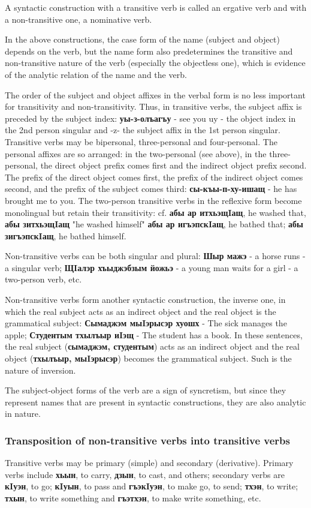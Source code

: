 \documentclass[a4paper,12pt]{book}
\newcommand{\1}[1]{\textbf{\emph{#1}}} %
\newcommand{\2}[1]{\textbf{[#1]}} %
\newcommand{\3}[1]{\fontsize{11pt}{0cm}\textbf{\emph{#1}}} %
\newcommand{\4}[1]{\fontsize{10pt}{0cm}\emph{#1}}	%
\newcommand{\5}[1]{\textbf{/#1/}} %
\newcommand{\6}[1]{\textbf{[#1]}} %
\newcommand{\7}[1]{\fontsize{12pt}{0cm}\emph{#1}} %
\newcommand{\8}[1]{\fontsize{12pt}{0cm}`#1'} %
\newcommand{\9}[1]{\fontsize{12pt}{0cm}(lit. `#1')} %
\begin{document}
A syntactic construction with a transitive verb is called an ergative verb and with a non-transitive one, a nominative verb.

In the above constructions, the case form of the name (subject and object) depends on the verb, but the name form also predetermines the transitive and non-transitive nature of the verb (especially the objectless one), which is evidence of the analytic relation of the name and the verb.

The order of the subject and object affixes in the verbal form is no less important for transitivity and non-transitivity. Thus, in transitive verbs, the subject affix is preceded by the subject index: \textbf{уы-з-олъагъу} - see you uy - the object index in the 2nd person singular and -z- the subject affix in the 1st person singular. Transitive verbs may be bipersonal, three-personal and four-personal. The personal affixes are so arranged: in the two-personal (see above), in the three-personal, the direct object prefix comes first and the indirect object prefix second. The prefix of the direct object comes first, the prefix of the indirect object comes second, and the prefix of the subject comes third: \textbf{сы-къы-п-ху-ишащ} - he has brought me to you. The two-person transitive verbs in the reflexive form become monolingual but retain their transitivity: cf. \textbf{абы ар итхьэщIащ}, he washed that, \textbf{абы зитхьэщIащ} "he washed himself" \textbf{абы ар игъэпскIащ}, he bathed that; \textbf{абы зигъэпскIащ}, he bathed himself.

Non-transitive verbs can be both singular and plural: \textbf{Шыр мажэ} - a horse runs - a singular verb; \textbf{ЩIалэр хъыджэбзым йожьэ} - a young man waits for a girl - a two-person verb, etc.

Non-transitive verbs form another syntactic construction, the inverse one, in which the real subject acts as an indirect object and the real object is the grammatical subject: \textbf{Сымаджэм мыIэрысэр хуошх} - The sick manages the apple; \textbf{Студентым тхылъыр иIэщ} - The student has a book. In these sentences, the real subject (\textbf{сымаджэм, студентым}) acts as an indirect object and the real object (\textbf{тхылъыр, мыIэрысэр}) becomes the grammatical subject. Such is the nature of inversion.

The subject-object forms of the verb are a sign of syncretism, but since they represent names that are present in syntactic constructions, they are also analytic in nature.
\subsubsection{Transposition of non-transitive verbs into transitive verbs}
Transitive verbs may be primary (simple) and secondary (derivative). Primary verbs include \textbf{хьын}, to carry, \textbf{дзын}, to cast, and others; secondary verbs are \textbf{кIуэн}, to go; \textbf{кIуын}, to pass and \textbf{гъэкIуэн}, to make go, to send; \textbf{тхэн}, to write; \textbf{тхын}, to write something and \textbf{гъэтхэн}, to make write something, etc.
\end{document}
